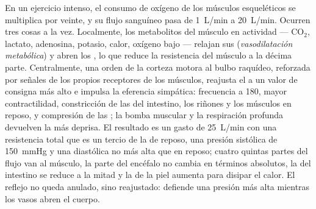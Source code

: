 \begin{proposition}[El ejercicio]\label{prop:b2:blood-pressure:exercise}
En un ejercicio intenso, el consumo de oxígeno de los músculos
esqueléticos se multiplica por veinte, y su flujo sanguíneo pasa de
\qty{1}{L/min} a \qty{20}{L/min}. Ocurren tres cosas a la vez. Localmente,
los metabolitos del músculo en actividad --- $\mathrm{CO_2}$, lactato,
adenosina, potasio, calor, oxígeno bajo --- relajan sus 
(\emph{vasodilatación metabólica}) y abren los , lo que reduce la
resistencia del músculo a la décima parte. Centralmente, una orden de la
corteza motora al bulbo raquídeo, reforzada por señales de los propios
receptores de los músculos, reajusta el  a un valor de consigna
más alto e impulsa la eferencia simpática: frecuencia a 180, mayor
contractilidad, constricción de las  del intestino, los riñones
y los músculos en reposo, y compresión de las ; la bomba muscular y
la respiración profunda devuelven la  más deprisa. El resultado es un
gasto de \qty{25}{L/min} con una resistencia total que es un tercio de la de
reposo, una presión sistólica de \qty{150}{mmHg} y una diastólica no más
alta que en reposo; cuatro quintas partes del flujo van al músculo, la
parte del encéfalo no cambia en términos absolutos, la del intestino se
reduce a la mitad y la de la piel aumenta para disipar el calor. El reflejo
no queda anulado, sino reajustado: defiende una presión más alta mientras
los vasos abren el cuerpo.
\end{proposition}

